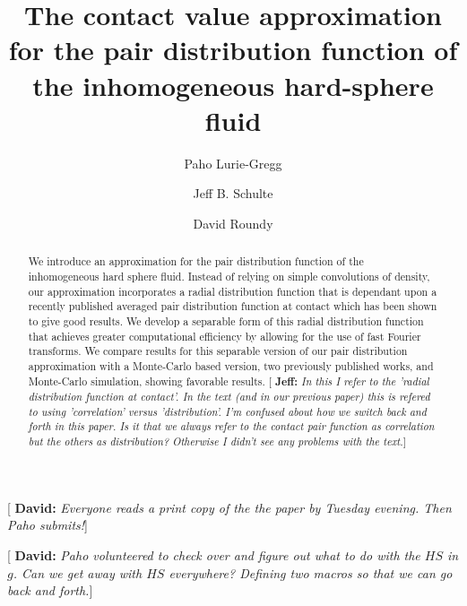 \documentclass[letterpaper,twocolumn,amsmath,amssymb,pre,aps,10pt]{revtex4-1}
\newcommand{\green}[1]{{\bf \color{green} #1}}
\newcommand{\davidsays}[1]{{\color{red} [\green{David:} \emph{#1}]}}
\newcommand{\jeffsays}[1]{{\color{red} [\green{Jeff:} \emph{#1}]}}
\begin{document}
\title{The contact value approximation for the pair distribution function of the inhomogeneous hard-sphere
  fluid}

\author{Paho Lurie-Gregg}
\author{Jeff B. Schulte}
\author{David Roundy}

\begin{abstract}
We introduce an approximation for the pair distribution function of
the inhomogeneous hard sphere fluid. Instead of relying on simple
convolutions of density, our approximation incorporates a radial
distribution function that is dependant upon a recently published
averaged pair distribution function at contact which has been shown to
give good results. We develop a separable form of this radial
distribution function that achieves greater computational efficiency
by allowing for the use of fast Fourier transforms. We compare results
for this separable version of our pair distribution approximation with
a Monte-Carlo based version, two previously published works, and
Monte-Carlo simulation, showing favorable results.  \jeffsays{In this
  I refer to the 'radial distribution function at contact'.  In the
  text (and in our previous paper) this is refered to using
  'correlation' versus 'distribution'.  I'm confused about how we
  switch back and forth in this paper.  Is it that we always refer to
  the contact pair function as correlation but the others as
  distribution?  Otherwise I didn't see any problems with the text.}
\end{abstract}

\maketitle

\newcommand\saftlocaldft{}
\newcommand\saftnonlocaldft{}

\davidsays{Everyone reads a print copy of the the paper by Tuesday
  evening.  Then Paho submits!}

\davidsays{Paho volunteered to check over and figure out what to do
  with the $HS$ in $g$.  Can we get away with $HS$ everywhere?
  Defining two macros so that we can go back and forth.}
\end{document}
